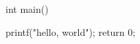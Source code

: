 \documentclass[10pt,a4paper]{article}
\begin{document}
\begin{pascalcode}
int main() {
    printf("hello, world");
    return 0;

}

\end{pascalcode}
\end{document}
